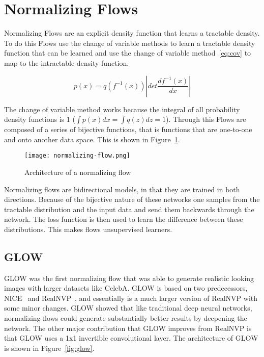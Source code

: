 \section{Normalizing Flows}\label{sec:nf}
Normalizing Flows are an explicit density function that learns a tractable
density. To do this Flows use the change of variable methods to learn a
tractable density function that can be learned and use the change of variable
method~\ref{eq:cov} to map to the intractable density function. 

\begin{equation}
p(x) = q(f^{-1}(x))|det\frac{df^{-1}(x)}{dx}|
\label{eq:cov}
\end{equation}

The change of variable method works because the integral of all probability
density functions is 1 ($\int p(x)dx = \int q(z)dz = 1$). Through this
Flows are composed of a series of bijective functions, that is functions that
are one-to-one and onto another data space. This is shown in
Figure~\ref{fig:nf}.

\begin{figure}[ht]
\centering
\texttt{[image: normalizing-flow.png]}
\caption{Architecture of a normalizing flow}
\label{fig:nf}
\end{figure}

Normalizing flows are bidirectional models, in that they are trained in both
directions. Because of the bijective nature of these networks one samples from
the tractable distribution and the input data and send them backwards through
the network. The loss function is then used to learn the difference between
these distributions. This makes flows unsupervised learners. 

\subsection{GLOW}
GLOW was the first normalizing flow that was able to generate realistic looking
images with larger datasets like CelebA. GLOW is based on two predecessors,
NICE~\cite{} and RealNVP~\cite{}, and essentially is a much larger version of
RealNVP with some minor changes. GLOW showed that like traditional deep neural
networks, normalizing flows could generate substantially better results by
deepening the network. The other major contribution that GLOW improves from
RealNVP is that GLOW uses a 1x1 invertible convolutional layer. The architecture
of GLOW is shown in Figure~\ref{fig:glow}.

